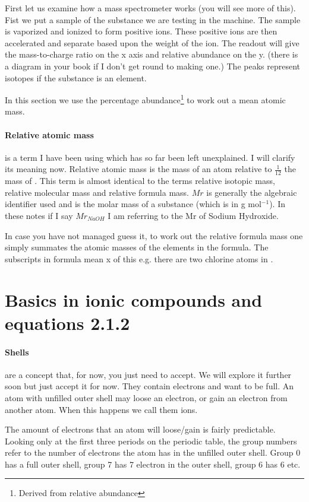 \documentclass[11pt,a4paper]{memoir}
\begin{document}
	First let us examine how a mass spectrometer works (you will see more of this). Fist we put a sample of the substance we are testing in the machine. The sample is vaporized and ionized to form positive ions. These positive ions are then accelerated and separate based upon the weight of the ion. The readout will give the mass-to-charge ratio on the x axis and relative abundance on the y. (there is a diagram in your book if I don't get round to making one.) The peaks represent isotopes if the substance is an element.
	
	In this section we use the percentage abundance\footnote{Derived from relative abundance} to work out a mean atomic mass.
	
	\paragraph{Relative atomic mass} is a term I have been using which has so far been left unexplained. I will clarify its meaning now. Relative atomic mass is the mass of an atom relative to $\frac{1}{12}$ the mass of . This term is almost identical to the terms relative isotopic mass, relative molecular mass and relative formula mass. $Mr$ is generally the algebraic identifier used and is the molar mass of a substance (which is in g mol$^{-1}$). In these notes if I say $Mr_{NaOH}$ I am referring to the Mr of Sodium Hydroxide.
	
	In case you have not managed guess it, to work out the relative formula mass one simply summates the atomic masses of the elements in the formula. The subscripts in formula mean x of this e.g. there are two chlorine atoms in .
	
\section{Basics in ionic compounds and equations 2.1.2}
	
	\paragraph{Shells} are a concept that, for now, you just need to accept. We will explore it further soon but just accept it for now. They contain electrons and want to be full. An atom with unfilled outer shell may loose an electron, or gain an electron from another atom. When this happens we call them ions. 
	
	The amount of electrons that an atom will loose/gain is fairly predictable. Looking only at the first three periods on the periodic table, the group numbers refer to the number of electrons the atom has in the unfilled outer shell. Group 0 has a full outer shell, group 7 has 7 electron in the outer shell, group 6 has 6 etc.
	
\end{document}
